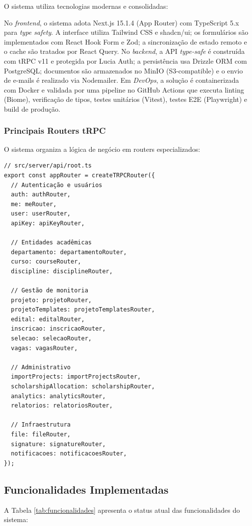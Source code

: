\documentclass[portuguese]{sbc2025}%
\begin{document}
O sistema utiliza tecnologias modernas e consolidadas:

No \textit{frontend}, o sistema adota Next.js 15.1.4 (App Router) com TypeScript 5.x para \textit{type safety}. A interface utiliza Tailwind CSS e shadcn/ui; os formulários são implementados com React Hook Form e Zod; a sincronização de estado remoto e o cache são tratados por React Query. No \textit{backend}, a API \textit{type-safe} é construída com tRPC v11 e protegida por Lucia Auth; a persistência usa Drizzle ORM com PostgreSQL; documentos são armazenados no MinIO (S3-compatible) e o envio de e-mails é realizado via Nodemailer. Em \textit{DevOps}, a solução é containerizada com Docker e validada por uma pipeline no GitHub Actions que executa linting (Biome), verificação de tipos, testes unitários (Vitest), testes E2E (Playwright) e build de produção.

\subsubsection{Principais Routers tRPC}

O sistema organiza a lógica de negócio em routers especializados:

\begin{verbatim}
// src/server/api/root.ts
export const appRouter = createTRPCRouter({
  // Autenticação e usuários
  auth: authRouter,
  me: meRouter,
  user: userRouter,
  apiKey: apiKeyRouter,

  // Entidades acadêmicas
  departamento: departamentoRouter,
  curso: courseRouter,
  discipline: disciplineRouter,

  // Gestão de monitoria
  projeto: projetoRouter,
  projetoTemplates: projetoTemplatesRouter,
  edital: editalRouter,
  inscricao: inscricaoRouter,
  selecao: selecaoRouter,
  vagas: vagasRouter,

  // Administrativo
  importProjects: importProjectsRouter,
  scholarshipAllocation: scholarshipRouter,
  analytics: analyticsRouter,
  relatorios: relatoriosRouter,

  // Infraestrutura
  file: fileRouter,
  signature: signatureRouter,
  notificacoes: notificacoesRouter,
});
\end{verbatim}

\subsection{Funcionalidades Implementadas}

A Tabela \ref{tab:funcionalidades} apresenta o status atual das funcionalidades do sistema:
\end{document}

